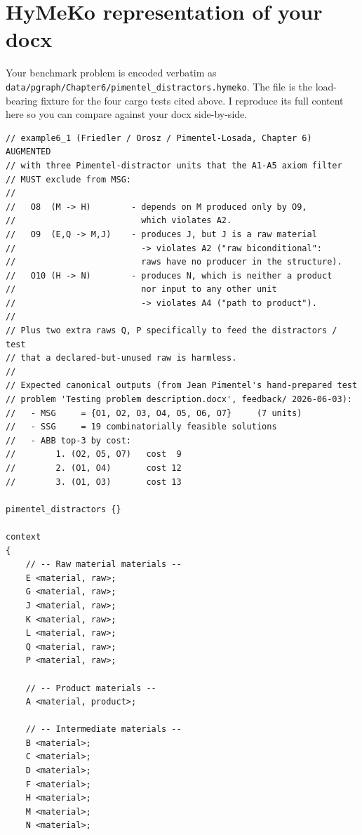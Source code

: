\documentclass[11pt]{article}
\begin{document}
\section{HyMeKo representation of your docx}
\label{app:hymeko}

Your benchmark problem is encoded verbatim as
\texttt{data/pgraph/Chapter6/pimentel\_distractors.hymeko}. The file
is the load-bearing fixture for the four cargo tests cited above. I
reproduce its full content here so you can compare against your docx
side-by-side.

\begin{lstlisting}
// example6_1 (Friedler / Orosz / Pimentel-Losada, Chapter 6) AUGMENTED
// with three Pimentel-distractor units that the A1-A5 axiom filter
// MUST exclude from MSG:
//
//   O8  (M -> H)        - depends on M produced only by O9,
//                         which violates A2.
//   O9  (E,Q -> M,J)    - produces J, but J is a raw material
//                         -> violates A2 ("raw biconditional":
//                         raws have no producer in the structure).
//   O10 (H -> N)        - produces N, which is neither a product
//                         nor input to any other unit
//                         -> violates A4 ("path to product").
//
// Plus two extra raws Q, P specifically to feed the distractors / test
// that a declared-but-unused raw is harmless.
//
// Expected canonical outputs (from Jean Pimentel's hand-prepared test
// problem 'Testing problem description.docx', feedback/ 2026-06-03):
//   - MSG     = {O1, O2, O3, O4, O5, O6, O7}     (7 units)
//   - SSG     = 19 combinatorially feasible solutions
//   - ABB top-3 by cost:
//        1. (O2, O5, O7)   cost  9
//        2. (O1, O4)       cost 12
//        3. (O1, O3)       cost 13

pimentel_distractors {}

context
{
    // -- Raw material materials --
    E <material, raw>;
    G <material, raw>;
    J <material, raw>;
    K <material, raw>;
    L <material, raw>;
    Q <material, raw>;
    P <material, raw>;

    // -- Product materials --
    A <material, product>;

    // -- Intermediate materials --
    B <material>;
    C <material>;
    D <material>;
    F <material>;
    H <material>;
    M <material>;
    N <material>;


\end{lstlisting}
\end{document}
